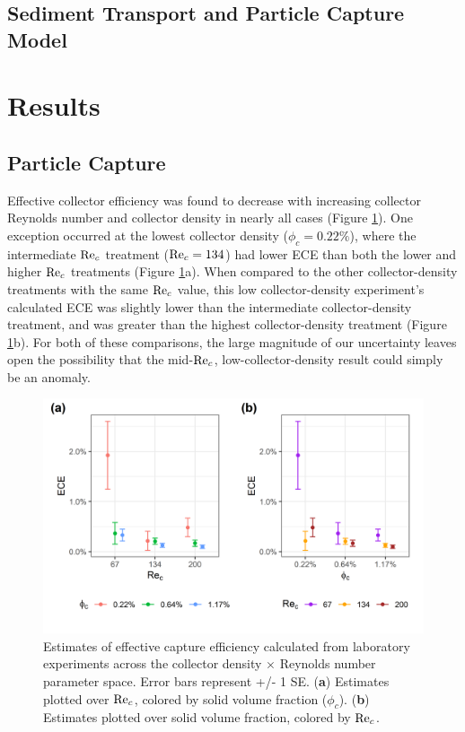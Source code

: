 \documentclass[geosciences,article,submit,moreauthors,pdftex]{Definitions/mdpi}
\begin{document}
\subsection{Sediment Transport and Particle Capture Model}

\section{Results}

\subsection{Particle Capture}

Effective collector efficiency was found to decrease with increasing collector Reynolds number and collector density in nearly all cases (Figure \ref{fig:ece}). One exception occurred at the lowest collector density ($\phi_c = 0.22\%$), where the intermediate $\mathrm{Re}_c$ treatment ($\mathrm{Re}_c = 134$) had lower ECE than both the lower and higher $\mathrm{Re}_c$ treatments (Figure \ref{fig:ece}a). When compared to the other collector-density treatments with the same $\mathrm{Re}_c$ value, this low collector-density experiment's calculated ECE was slightly lower than the intermediate collector-density treatment, and was greater than the highest collector-density treatment (Figure \ref{fig:ece}b). For both of these comparisons, the large magnitude of our uncertainty leaves open the possibility that the mid-$\mathrm{Re}_c$, low-collector-density result could simply be an anomaly.

\begin{figure}[H]
\centering
\includegraphics[width=5in]{../pics/ece_plot.png}
\caption{Estimates of effective capture efficiency calculated from laboratory experiments across the collector density $\times$ Reynolds number parameter space. Error bars represent +/- 1 SE. (\textbf{a}) Estimates plotted over $\mathrm{Re}_c$, colored by solid volume fraction ($\phi_c$). (\textbf{b}) Estimates plotted over solid volume fraction, colored by $\mathrm{Re}_c$.}
\label{fig:ece}
\end{figure}   
\end{document}
